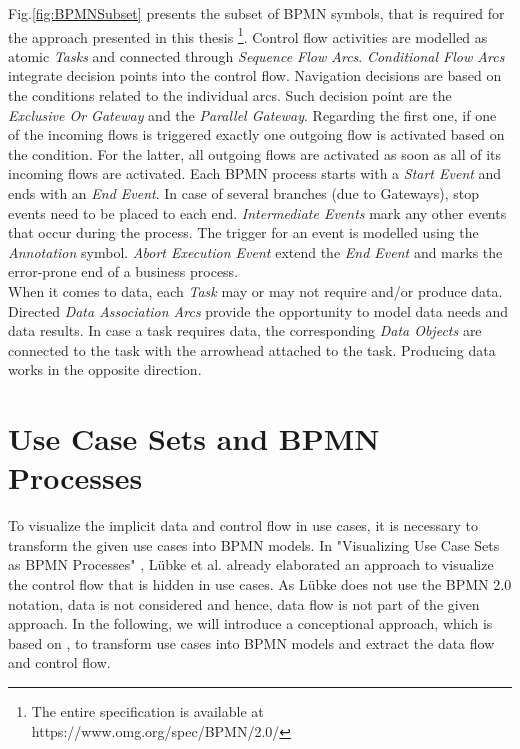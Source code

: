 \noindent
Fig.\ref{fig:BPMNSubset} presents the subset of BPMN symbols, that is required for the approach presented in this thesis \footnote{The entire specification is available at https://www.omg.org/spec/BPMN/2.0/}. Control flow activities are modelled as atomic \textit{Tasks} and connected through \textit{Sequence Flow Arcs}. \textit{Conditional Flow Arcs} integrate decision points into the control flow. Navigation decisions are based on the conditions related to the individual arcs. Such decision point are the \textit{Exclusive Or Gateway} and the \textit{Parallel Gateway}. Regarding the first one, if one of the incoming flows is triggered exactly one outgoing flow is activated based on the condition. For the latter, all outgoing flows are activated as soon as all of its incoming flows are activated. Each BPMN process starts with a \textit{Start Event} and ends with an \textit{End Event}. In case of several branches (due to Gateways), stop events need to be placed to each end. \textit{Intermediate Events} mark any other events that occur during the process. The trigger for an event is modelled using the \textit{Annotation} symbol. \textit{Abort Execution Event} extend the \textit{End Event} and marks the error-prone end of a business process. \\
When it comes to data, each \textit{Task} may or may not require and/or produce data. Directed \textit{Data Association Arcs} provide the opportunity to model data needs and data results. In case a task requires data, the corresponding \textit{Data Objects} are connected to the task with the arrowhead attached to the task. Producing data works in the opposite direction. \\









\section{Use Case Sets and BPMN Processes}
\label{sec:PrepApproach:TransformUCtoBPMN}
To visualize the implicit data and control flow in use cases, it is necessary to transform the given use cases into BPMN models. In "Visualizing Use Case Sets as BPMN Processes" \cite{VisualizeBPMN}, Lübke et al. already elaborated an approach to visualize the control flow that is hidden in use cases. As Lübke does not use the BPMN 2.0 notation, data is not considered and hence, data flow is not part of the given approach. In the following, we will introduce a conceptional approach, which is based on \cite{VisualizeBPMN}, to transform use cases into BPMN models and extract the data flow and control flow.



